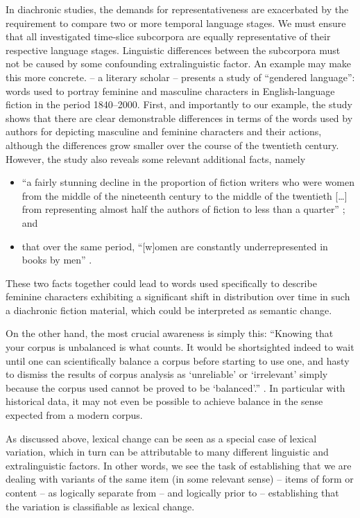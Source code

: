 \documentclass[output=paper]{langsci/langscibook}
\begin{document}
In diachronic studies, the demands for representativeness are
exacerbated by the requirement to compare two or more temporal
language stages. We must ensure that all investigated time-slice
subcorpora are equally representative of their respective language
stages. Linguistic differences between the subcorpora must not be
caused by some confounding extralinguistic factor. An example may make
this more concrete. \citet[Ch. 4]{underwood-2019} -- a literary
scholar -- presents a study of ``gendered language'': words used to
portray feminine and masculine characters in English-language fiction
in the period 1840--2000. First, and importantly to our example, the
study shows that there are clear demonstrable differences in terms of
the words used by authors for depicting masculine and feminine
characters and their actions, although the differences grow smaller
over the course of the twentieth century. However, the study also
reveals some relevant additional facts, namely
\begin{itemize}
\item ``a fairly stunning decline in the proportion of fiction writers who were women from the middle of the nineteenth century to the middle of the twentieth [\ldots] from representing almost half the authors of fiction to less than a quarter'' \citep[133]{underwood-2019}; and
\item that over the same period, ``[w]omen are constantly underrepresented in books by men'' \citep[127]{underwood-2019}.
\end{itemize}

These two facts together could lead to words used specifically to
describe feminine characters exhibiting a significant shift in
distribution over time in such a diachronic fiction material, which
could be interpreted as semantic change.

On the other hand, the most crucial awareness is simply this:
``Knowing that your corpus is unbalanced is what counts. It would be
shortsighted indeed to wait until one can scientifically balance a
corpus before starting to use one, and hasty to dismiss the results of
corpus analysis as `unreliable' or `irrelevant' simply because the
corpus used cannot be proved to be `balanced'.''
\citep[6]{atkins-etal-1992}. In particular with historical data, it may
not even be possible to achieve balance in the sense expected from a
modern corpus.

As discussed above, lexical change can be seen as a special case of
lexical variation, which in turn can be attributable to many different
linguistic and extralinguistic factors. In other words, we see the
task of establishing that we are dealing with variants of the same
item (in some relevant sense) -- items of form or content -- as
logically separate from -- and logically prior to -- establishing that
the variation is classifiable as lexical change.
\end{document}
